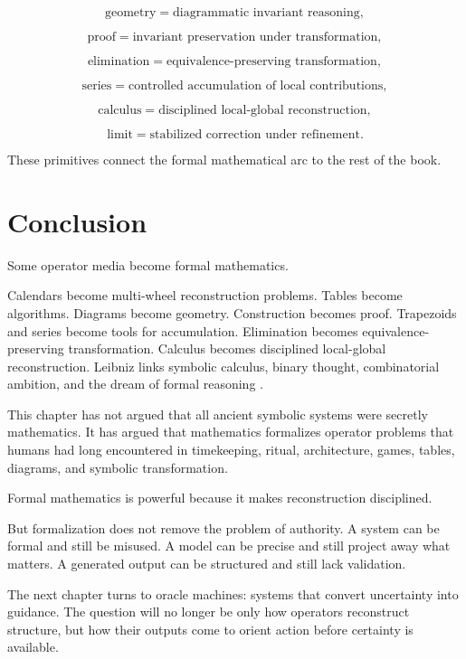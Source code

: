 \documentclass[11pt]{book}
\begin{document}
\[
\text{geometry} = \text{diagrammatic invariant reasoning},
\]

\[
\text{proof} = \text{invariant preservation under transformation},
\]

\[
\text{elimination} = \text{equivalence-preserving transformation},
\]

\[
\text{series} = \text{controlled accumulation of local contributions},
\]

\[
\text{calculus} = \text{disciplined local-global reconstruction},
\]

\[
\text{limit} = \text{stabilized correction under refinement}.
\]

These primitives connect the formal mathematical arc to the rest of the book.

\section{Conclusion}

Some operator media become formal mathematics.

Calendars become multi-wheel reconstruction problems. Tables become algorithms. Diagrams become geometry. Construction becomes proof. Trapezoids and series become tools for accumulation. Elimination becomes equivalence-preserving transformation. Calculus becomes disciplined local-global reconstruction. Leibniz links symbolic calculus, binary thought, combinatorial ambition, and the dream of formal reasoning \cite{Neugebauer1957ExactSciences,Robson2008MathematicsAncientIraq,EuclidHeath1956Elements,Needham1959ScienceCivilisationChina3,Ossendrijver2016AncientBabylonianAstronomers,Leibniz1697Binary}.

This chapter has not argued that all ancient symbolic systems were secretly mathematics. It has argued that mathematics formalizes operator problems that humans had long encountered in timekeeping, ritual, architecture, games, tables, diagrams, and symbolic transformation.

Formal mathematics is powerful because it makes reconstruction disciplined.

But formalization does not remove the problem of authority. A system can be formal and still be misused. A model can be precise and still project away what matters. A generated output can be structured and still lack validation.

The next chapter turns to oracle machines: systems that convert uncertainty into guidance. The question will no longer be only how operators reconstruct structure, but how their outputs come to orient action before certainty is available.
\end{document}
